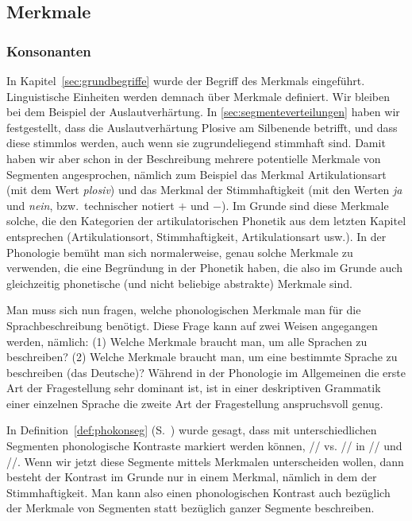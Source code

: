 \subsection{Merkmale}

\label{sec:features}

\subsubsection{Konsonanten}

\label{sec:konsonantenmerkmale}

In Kapitel~\ref{sec:grundbegriffe} wurde der Begriff des Merkmals eingeführt.
Linguistische Einheiten werden demnach über Merkmale definiert.
Wir bleiben bei dem Beispiel der Auslautverhärtung.
In \ref{sec:segmenteverteilungen} haben wir festgestellt, dass die Auslautverhärtung Plosive am Silbenende betrifft, und dass diese stimmlos werden, auch wenn sie zugrundeliegend stimmhaft sind.
Damit haben wir aber schon in der Beschreibung mehrere potentielle Merkmale von Segmenten angesprochen, nämlich zum Beispiel das Merkmal Artikulationsart (mit dem Wert \textit{plosiv}) und das Merkmal der Stimmhaftigkeit (mit den Werten \textit{ja} und \textit{nein}, bzw.\ technischer notiert $+$ und $-$).
Im Grunde sind diese Merkmale solche, die den Kategorien der artikulatorischen Phonetik aus dem letzten Kapitel entsprechen (Artikulationsort, Stimmhaftigkeit, Artikulationsart usw.).
In der Phonologie bemüht man sich normalerweise, genau solche Merkmale zu verwenden, die eine Begründung in der Phonetik haben, die also im Grunde auch gleichzeitig phonetische (und nicht beliebige abstrakte) Merkmale sind.

Man muss sich nun fragen, welche phonologischen Merkmale man für die Sprachbeschreibung benötigt.
Diese Frage kann auf zwei Weisen angegangen werden, nämlich:
(1) Welche Merkmale braucht man, um alle Sprachen zu beschreiben?
(2) Welche Merkmale braucht man, um eine bestimmte Sprache zu beschreiben (\zB das Deutsche)?
Während in der Phonologie im Allgemeinen die erste Art der Fragestellung sehr dominant ist, ist in einer deskriptiven Grammatik einer einzelnen Sprache die zweite Art der Fragestellung anspruchsvoll genug.

In Definition~\ref{def:phokonseg} (S.~\pageref{def:phokonseg}) wurde gesagt, dass mit unterschiedlichen Segmenten phonologische Kontraste markiert werden können, \zB // vs. // in // und //.
Wenn wir jetzt diese Segmente mittels Merkmalen unterscheiden wollen, dann besteht der Kontrast im Grunde nur in einem Merkmal, nämlich in dem der Stimmhaftigkeit.
Man kann also einen phonologischen Kontrast auch bezüglich der Merkmale von Segmenten statt bezüglich ganzer Segmente beschreiben.

